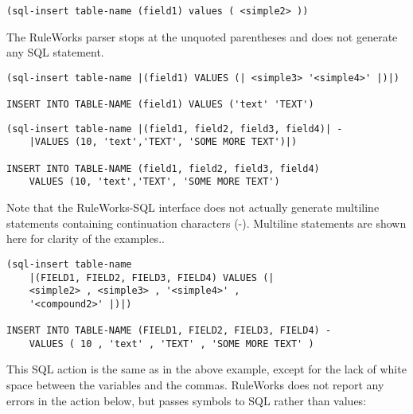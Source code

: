 \begin{exampl}
\begin{verbatim}
(sql-insert table-name (field1) values ( <simple2> ))
\end{verbatim}
\vspace{1ex}

  The RuleWorks parser stops at the unquoted parentheses and does not
  generate any SQL statement.
\end{exampl}

\begin{exampl}
\begin{verbatim}
(sql-insert table-name |(field1) VALUES (| <simple3> '<simple4>' |)|)

INSERT INTO TABLE-NAME (field1) VALUES ('text' 'TEXT')
\end{verbatim}
\end{exampl}


\begin{exampl}
\begin{verbatim}
(sql-insert table-name |(field1, field2, field3, field4)| -
    |VALUES (10, 'text','TEXT', 'SOME MORE TEXT')|)

INSERT INTO TABLE-NAME (field1, field2, field3, field4)
    VALUES (10, 'text','TEXT', 'SOME MORE TEXT')
\end{verbatim}
\end{exampl}
      

Note that the RuleWorks-SQL interface does not actually generate
multiline statements containing continuation characters (\co-). Multiline
statements are shown here for clarity of the examples..

\begin{exampl}
\begin{verbatim}
(sql-insert table-name
    |(FIELD1, FIELD2, FIELD3, FIELD4) VALUES (|
    <simple2> , <simple3> , '<simple4>' ,
    '<compound2>' |)|)

INSERT INTO TABLE-NAME (FIELD1, FIELD2, FIELD3, FIELD4) -
    VALUES ( 10 , 'text' , 'TEXT' , 'SOME MORE TEXT' )
\end{verbatim}
\end{exampl}

This SQL action is the same as in the above example, except for the
lack of white space between the variables and the commas. RuleWorks
does not report any errors in the action below, but passes symbols to
SQL rather than values:

